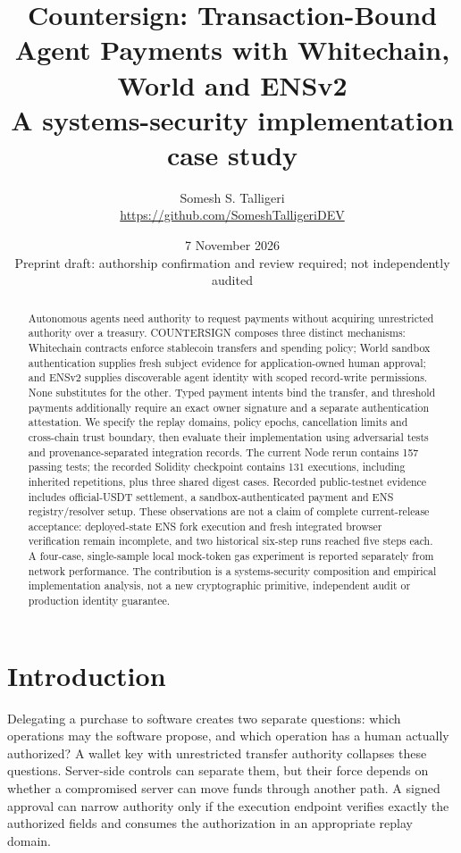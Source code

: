 \documentclass[11pt]{article}
\title{Countersign: Transaction-Bound Agent Payments with Whitechain, World and ENSv2\\\large A systems-security implementation case study}
\author{Somesh S. Talligeri\\\small\url{https://github.com/SomeshTalligeriDEV}}
\date{7 November 2026\\\small Preprint draft: authorship confirmation and review required; not independently audited}
\begin{document}
\maketitle
\begin{abstract}
Autonomous agents need authority to request payments without acquiring unrestricted authority over a treasury. COUNTERSIGN composes three distinct mechanisms: Whitechain contracts enforce stablecoin transfers and spending policy; World sandbox authentication supplies fresh subject evidence for application-owned human approval; and ENSv2 supplies discoverable agent identity with scoped record-write permissions. None substitutes for the other. Typed payment intents bind the transfer, and threshold payments additionally require an exact owner signature and a separate authentication attestation. We specify the replay domains, policy epochs, cancellation limits and cross-chain trust boundary, then evaluate their implementation using adversarial tests and provenance-separated integration records. The current Node rerun contains 157 passing tests; the recorded Solidity checkpoint contains 131 executions, including inherited repetitions, plus three shared digest cases. Recorded public-testnet evidence includes official-USDT settlement, a sandbox-authenticated payment and ENS registry/resolver setup. These observations are not a claim of complete current-release acceptance: deployed-state ENS fork execution and fresh integrated browser verification remain incomplete, and two historical six-step runs reached five steps each. A four-case, single-sample local mock-token gas experiment is reported separately from network performance. The contribution is a systems-security composition and empirical implementation analysis, not a new cryptographic primitive, independent audit or production identity guarantee.
\end{abstract}

\section{Introduction}
Delegating a purchase to software creates two separate questions: which operations may the software propose, and which operation has a human actually authorized? A wallet key with unrestricted transfer authority collapses these questions. Server-side controls can separate them, but their force depends on whether a compromised server can move funds through another path. A signed approval can narrow authority only if the execution endpoint verifies exactly the authorized fields and consumes the authorization in an appropriate replay domain.
\end{document}
